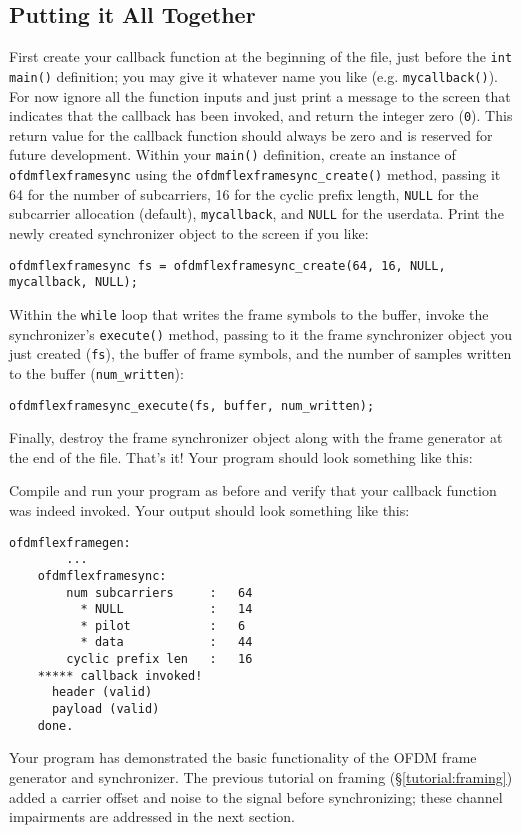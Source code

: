 %
%
\subsection{Putting it All Together}
\label{tutorial:ofdmflexframe:xxx}
First create your callback function at the beginning of the file, just
before the {\tt int main()} definition;
you may give it whatever name you like (e.g. {\tt mycallback()}).
For now ignore all the function inputs and just print a message to the
screen that indicates that the callback has been invoked,
and return the integer zero ({\tt 0}).
This return value for the callback function should always be zero
and is reserved for future development.
Within your {\tt main()} definition, create an instance of
{\tt ofdmflexframesync} using the {\tt ofdmflexframesync\_create()}
method, passing it
  64 for the number of subcarriers,
  16 for the cyclic prefix length,
  {\tt NULL} for the subcarrier allocation (default),
  {\tt mycallback}, and
  {\tt NULL} for the userdata.
Print the newly created synchronizer object to the screen if you like:
%
\begin{Verbatim}[fontsize=\small]
    ofdmflexframesync fs = ofdmflexframesync_create(64, 16, NULL, mycallback, NULL);
\end{Verbatim}
%
Within the {\tt while} loop that writes the frame symbols to the buffer,
invoke the synchronizer's {\tt execute()} method,
passing to it the frame synchronizer object you just created ({\tt fs}),
the buffer of frame symbols,
and the number of samples written to the buffer ({\tt num\_written}):
%
\begin{Verbatim}[fontsize=\small]
    ofdmflexframesync_execute(fs, buffer, num_written);
\end{Verbatim}
%
Finally, destroy the frame synchronizer object along with the frame
generator at the end of the file.
That's it!
Your program should look something like this:
%

%
Compile and run your program as before and verify that your callback
function was indeed invoked.
Your output should look something like this:
%
\begin{Verbatim}[fontsize=\small]
    ofdmflexframegen:
        ...
    ofdmflexframesync:
        num subcarriers     :   64
          * NULL            :   14
          * pilot           :   6
          * data            :   44
        cyclic prefix len   :   16
    ***** callback invoked!
      header (valid)
      payload (valid)
    done.
\end{Verbatim}
%
Your program has demonstrated the basic functionality of the OFDM frame
generator and synchronizer.
The previous tutorial on framing (\S\ref{tutorial:framing}) added
a carrier offset and noise to the signal before synchronizing;
these channel impairments are addressed in the next section.
%
%

